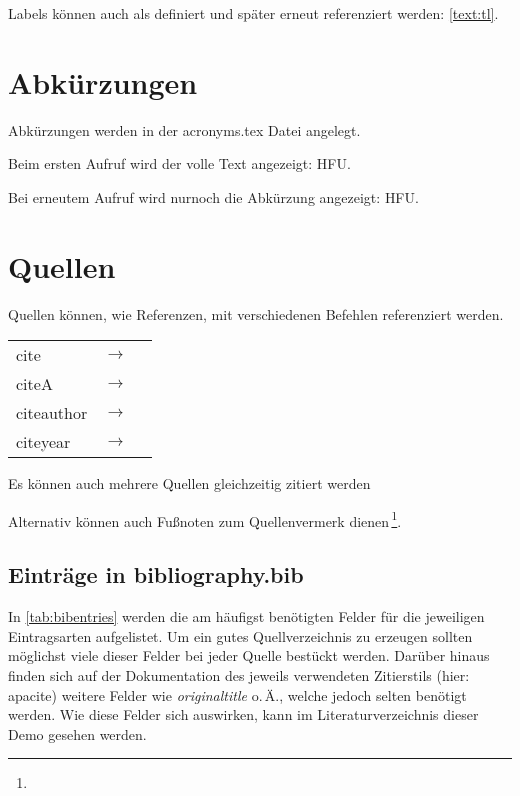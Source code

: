 Labels können auch als  definiert und später erneut referenziert werden: \ref{text:tl}.

\section{Abkürzungen}
\label{sec:Abkuerzungen}

Abkürzungen werden in der acronyms.tex Datei angelegt.

Beim ersten Aufruf wird der volle Text angezeigt: \ac{HFU}.

Bei erneutem Aufruf wird nurnoch die Abkürzung angezeigt: \ac{HFU}.

\section{Quellen}
\label{sec:Quellen}

Quellen können, wie Referenzen, mit verschiedenen Befehlen referenziert werden.

{
	\def\arraystretch{1.2}
	\begin{tabular}{@{}lcl@{}}
		\normalsize cite & $\rightarrow$ & \normalsize\cite{mustermann12} \\
		\normalsize citeA & $\rightarrow$ & \normalsize\citeA{mustermann12} \\
		\normalsize citeauthor & $\rightarrow$ & \normalsize\citeauthor{mustermann12} \\
		\normalsize citeyear & $\rightarrow$ & \normalsize\citeyear{mustermann12} \\
	\end{tabular}
}

Es können auch mehrere Quellen gleichzeitig zitiert werden \cite{doe01,musterfrau20,normal19}

Alternativ können auch Fußnoten zum Quellenvermerk dienen\,\footnote{}. %

\subsection{Einträge in bibliography.bib}
\label{sub:Eintraege_in_bibliography.bib}

In \autoref{tab:bibentries} werden die am häufigst benötigten Felder für die jeweiligen Eintragsarten aufgelistet.
Um ein gutes Quellverzeichnis zu erzeugen sollten möglichst viele dieser Felder bei jeder Quelle bestückt werden.
Darüber hinaus finden sich auf der Dokumentation des jeweils verwendeten Zitierstils (hier: apacite) weitere Felder wie \emph{originaltitle} o.\,Ä., welche jedoch selten benötigt werden.
Wie diese Felder sich auswirken, kann im Literaturverzeichnis dieser Demo gesehen werden.

